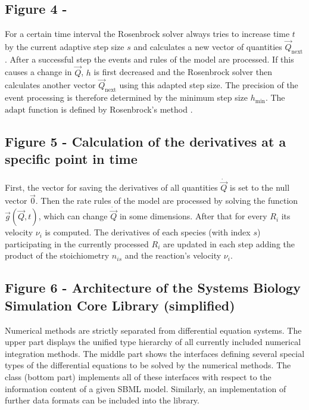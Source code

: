 \documentclass[10pt]{bmc_article}
\newenvironment{bmcformat}{\begin{raggedright}\baselineskip20pt\sloppy\setboolean{publ}{false}}{\end{raggedright}\baselineskip20pt\sloppy}
\begin{document}
\begin{bmcformat}
\subsection*{Figure 4 - }
For a certain time interval\COR{,} the Rosenbrock solver  always tries to increase time $t$ by the current adaptive
step size $s$ and calculates a new vector of quantities $\vec{Q}_{\mathrm{next}}$.
After a successful step\COR{,} the events and rules of the model are processed.
If this causes a change in $\vec{Q}$, $h$ is first decreased and the
Rosenbrock solver then calculates another vector $\vec{Q}_\mathrm{next}$ using this adapted step size.
The precision of the event processing is therefore determined by the minimum step size $h_{\min}$.
The $\mathrm{adapt}$ function is defined by Rosenbrock's method \cite{Press1993}.

\subsection*{Figure 5 - Calculation of the derivatives at a specific point in time}
First, the vector for saving the derivatives of all quantities $\dot{\vec{Q}}$ is set to the null vector $\vec{0}$.
Then the rate rules of the model are processed by solving the function $\vec{g}(\vec{Q}, t)$, which can change $\dot{\vec{Q}}$ in some dimensions.
After that for every  $R_i$ its velocity $\nu_i$ is computed.
The derivatives of each species (with index $s$) participating in the currently processed  $R_i$ are updated
in each step adding the product of the stoichiometry $n_{is}$ and the reaction's velocity $\nu_i$.

\subsection*{Figure 6 - Architecture of the Systems Biology Simulation Core Library (simplified)}
Numerical methods are strictly separated from differential equation systems. The
upper part displays the unified type hierarchy of all currently included numerical integration
methods. The middle part shows the interfaces defining several
special types of the differential equations to be solved by the numerical
methods.
The class \SBMLinterpreter (bottom part) implements all of these interfaces
with respect to the information content of a given \acs{SBML} model. Similarly, an
implementation of further data formats can be included into the
library.


\end{bmcformat}
\end{document}
